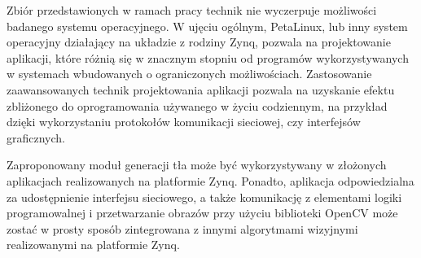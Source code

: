 Zbiór przedstawionych w ramach pracy technik nie wyczerpuje możliwości badanego systemu operacyjnego. 
W ujęciu ogólnym, PetaLinux, lub inny system operacyjny działający na układzie z rodziny Zynq, pozwala na projektowanie aplikacji, które różnią się w znacznym stopniu od programów wykorzystywanych w systemach wbudowanych o ograniczonych możliwościach. 
Zastosowanie zaawansowanych technik projektowania aplikacji pozwala na uzyskanie efektu zbliżonego do oprogramowania używanego w życiu codziennym, na przykład dzięki wykorzystaniu protokołów komunikacji sieciowej, czy interfejsów graficznych.

Zaproponowany moduł generacji tła może być wykorzystywany w złożonych aplikacjach realizowanych na platformie Zynq. Ponadto, aplikacja odpowiedzialna za udostępnienie interfejsu sieciowego, a także komunikację z elementami logiki programowalnej i przetwarzanie obrazów przy użyciu biblioteki OpenCV może zostać w prosty sposób zintegrowana z innymi algorytmami wizyjnymi realizowanymi na platformie Zynq.


